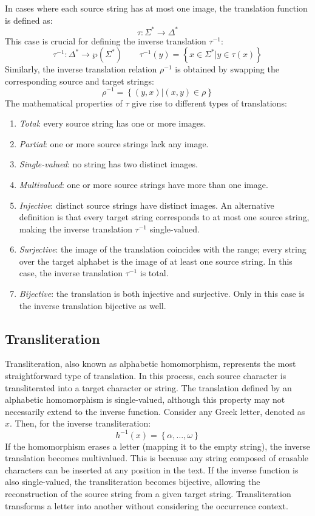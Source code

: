 In cases where each source string has at most one image, the translation function is defined as:
\[ \tau : \Sigma^{*} \rightarrow \Delta^{*} \]
This case is crucial for defining the inverse translation $\tau^{-1}$:
\[ \tau^{-1} : \Delta^{*} \rightarrow \wp\left( \Sigma^{*} \right) \qquad \tau^{-1}(y) = \left\{ x \in \Sigma^{*} | y \in \tau(x) \right\} \]
Similarly, the inverse translation relation $\rho^{-1}$ is obtained by swapping the corresponding source and target strings:
\[ \rho^{-1} = \left\{ \left( y, x \right) | \left( x, y \right) \in \rho \right\} \]
The mathematical properties of $\tau$ give rise to different types of translations:
\begin{enumerate}
    \item \textit{Total}: every source string has one or more images.
    \item \textit{Partial}: one or more source strings lack any image.
    \item \textit{Single-valued}: no string has two distinct images.
    \item \textit{Multivalued}: one or more source strings have more than one image.
    \item \textit{Injective}: distinct source strings have distinct images. 
        An alternative definition is that every target string corresponds to at most one source string, making the inverse translation $\tau^{-1}$ single-valued.
    \item \textit{Surjective}: the image of the translation coincides with the range; every string over the target alphabet is the image of at least one source string.
        In this case, the inverse translation $\tau^{-1}$ is total.
    \item \textit{Bijective}: the translation is both injective and surjective. 
        Only in this case is the inverse translation bijective as well.
\end{enumerate}

\subsection{Transliteration}
Transliteration, also known as alphabetic homomorphism, represents the most straightforward type of translation.
In this process, each source character is transliterated into a target character or string.
The translation defined by an alphabetic homomorphism is single-valued, although this property may not necessarily extend to the inverse function.
Consider any Greek letter, denoted as $x$. Then, for the inverse transliteration:
\[ h^{-1}\left( x \right) = \left\{ \alpha, \dots, \omega \right\} \]
If the homomorphism erases a letter (mapping it to the empty string), the inverse translation becomes multivalued.
This is because any string composed of erasable characters can be inserted at any position in the text. 
If the inverse function is also single-valued, the transliteration becomes bijective, allowing the reconstruction of the source string from a given target string.
Transliteration transforms a letter into another without considering the occurrence context.


